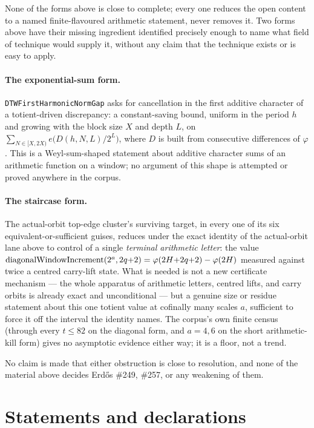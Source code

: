 \documentclass[11pt]{article}
\theoremstyle{breakplain}
\theoremstyle{breakdefinition}
\theoremstyle{breakdefinition}
\let\origmathrm\mathrm
\renewcommand{\mathrm}[1]{\ifmmode\origmathrm{#1}\else\textrm{#1}\fi}%
\begin{document}
None of the forms above is close to complete; every one reduces the open
content to a named finite-flavoured arithmetic statement, never removes it.
Two forms above have their missing ingredient identified precisely enough
to name what field of technique would supply it, without any claim that the
technique exists or is easy to apply.

\paragraph{The exponential-sum form.} \texttt{DTWFirstHarmonicNormGap} asks
for cancellation in the first additive character of a totient-driven
discrepancy: a constant-saving bound, uniform in the period $h$ and growing
with the block size $X$ and depth $L$, on
$\sum_{N\in[X,2X)} e\bigl(D(h,N,L)/2^L\bigr)$, where $D$ is built from
consecutive differences of $\varphi$. This is a Weyl-sum-shaped statement
about additive character sums of an arithmetic function on a window; no
argument of this shape is attempted or proved anywhere in the corpus.

\paragraph{The staircase form.} The actual-orbit top-edge cluster's surviving
target, in every one of its six equivalent-or-sufficient guises, reduces
under the exact identity of the actual-orbit lane above to control of a single \emph{terminal
arithmetic letter}: the value $\mathrm{diagonalWindowIncrement}(2^a,2q{+}2)
= \varphi(2H{+}2q{+}2)-\varphi(2H)$ measured against twice a centred
carry-lift state. What is needed is not a new certificate mechanism — the
whole apparatus of arithmetic letters, centred lifts, and carry orbits is
already exact and unconditional — but a genuine size or residue statement
about this one totient value at cofinally many scales $a$, sufficient to
force it off the interval the identity names. The corpus's own finite
census (through every $t\le82$ on the diagonal form, and $a=4,6$ on the short
arithmetic-kill form) gives no asymptotic evidence either way; it is a
floor, not a trend.

No claim is made that either obstruction is close to resolution, and none
of the material above decides Erdős \#249, \#257, or any weakening of them.

\clearpage
\section*{Statements and declarations}
\end{document}
